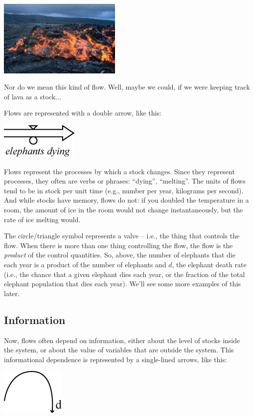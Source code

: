 \begin{marginfigure}
\includegraphics[width=6cm]{figs/lavaflow}
\caption{Nor do we mean this kind of flow. Well, maybe we could, if we were keeping track of lava as a stock...}
\end{marginfigure}
Flows are represented with a double arrow, like this:

\beforefig
\centerline{\includegraphics[height=.4in]{figs/flow}}
\afterfig


Flows represent the processes by which a stock changes.  Since they represent processes, they often are verbs or phrases:  ``dying'', ``melting''.  The units of flows tend to be in stock per unit time (e.g., number per year, kilograms per second).  And while stocks have memory, flows do not: if you doubled the temperature 
in a room, the amount of ice in the room would not change instantaneously, but the rate of ice melting would.  

The circle/triangle symbol represents a valve -- i.e., the thing that controls the flow.  When there is more than one thing controlling the flow, the flow is the {\em product} of the control quantities.  So, above, the number of elephants that die each year is a product of the number of elephants and $d$, the elephant death rate (i.e., the chance that a given elephant dies each year, or the fraction of the total elephant population that dies each year).  We'll see some more examples of this later.


\subsection{Information}

Now, flows often depend on information, either about the level of stocks inside the system, or about the value of variables that are outside the system.  This informational dependence is represented by a single-lined arrows, like this:

\beforefig
\centerline{\includegraphics[height=.5in]{figs/information}} 
\afterfig

